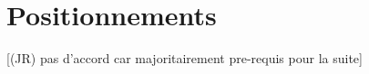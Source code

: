 



\chapter{Positionnements}


\label{ch:positioning} %



[(JR) pas d'accord car majoritairement pre-requis pour la suite]

\bigskip


